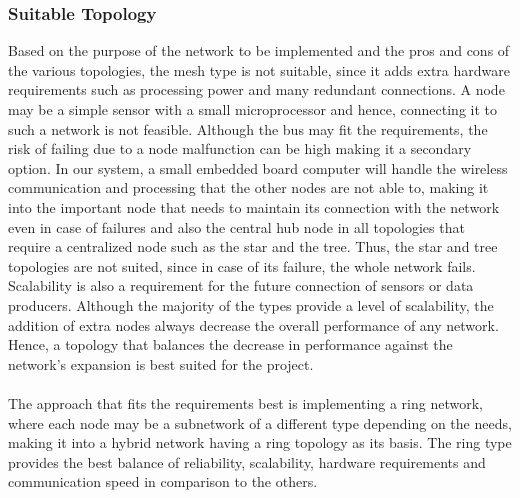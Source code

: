 \subsubsection{Suitable Topology}
Based on the purpose of the network to be implemented and the pros and cons of the various topologies, the mesh type is not suitable, since it adds extra hardware requirements such as processing power and many redundant connections. A node may be a simple sensor with a small microprocessor and hence, connecting it to such a network is not feasible. Although the bus may fit the requirements, the risk of failing due to a node malfunction can be high making it a secondary option. In our system, a small embedded board computer will handle the wireless communication and processing that the other nodes are not able to, making it into the important node that needs to maintain its connection with the network even in case of failures and also the central hub node in all topologies that require a centralized node such as the star and the tree. Thus, the star and tree topologies are not suited, since in case of its failure, the whole network fails. Scalability is also a requirement for the future connection of sensors or data producers. Although the majority of the types provide a level of scalability, the addition of extra nodes always decrease the overall performance of any network. Hence, a topology that balances the decrease in performance against the network's expansion is best suited for the project.\\\\
The approach that fits the requirements best is implementing a ring network, where each node may be a subnetwork of a different type depending on the needs, making it into a hybrid network having a ring topology as its basis. The ring type provides the best balance of reliability, scalability, hardware requirements and communication speed in comparison to the others.


